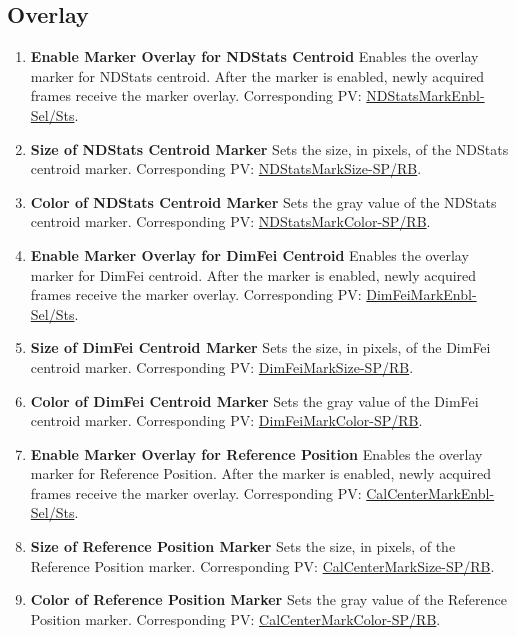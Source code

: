 \documentclass[openany]{article}
\begin{document}
    \subsection{Overlay}\label{sec:overlay}

        \begin{enumerate}
            \item \textbf{Enable Marker Overlay for NDStats Centroid} Enables the overlay marker for NDStats centroid. After the marker is enabled, newly acquired frames receive the marker overlay. Corresponding PV: \hyperlink{pv:ndstats-mark-enbl}{NDStatsMarkEnbl-Sel/Sts}.
            \item \textbf{Size of NDStats Centroid Marker} Sets the size, in pixels, of the NDStats centroid marker. Corresponding PV: \hyperlink{pv:ndstats-mark-size}{NDStatsMarkSize-SP/RB}.
            \item \textbf{Color of NDStats Centroid Marker} Sets the gray value of the NDStats centroid marker. Corresponding PV: \hyperlink{pv:ndstats-mark-color}{NDStatsMarkColor-SP/RB}.
            \item \textbf{Enable Marker Overlay for DimFei Centroid} Enables the overlay marker for DimFei centroid. After the marker is enabled, newly acquired frames receive the marker overlay. Corresponding PV: \hyperlink{pv:dimfei-mark-enbl}{DimFeiMarkEnbl-Sel/Sts}.
            \item \textbf{Size of DimFei Centroid Marker} Sets the size, in pixels, of the DimFei centroid marker. Corresponding PV: \hyperlink{pv:dimfei-mark-size}{DimFeiMarkSize-SP/RB}.
            \item \textbf{Color of DimFei Centroid Marker} Sets the gray value of the DimFei centroid marker. Corresponding PV: \hyperlink{pv:dimfei-mark-color}{DimFeiMarkColor-SP/RB}.
            \item \textbf{Enable Marker Overlay for Reference Position} Enables the overlay marker for Reference Position. After the marker is enabled, newly acquired frames receive the marker overlay. Corresponding PV: \hyperlink{pv:cal-center-mark-enbl}{CalCenterMarkEnbl-Sel/Sts}.
            \item \textbf{Size of Reference Position Marker} Sets the size, in pixels, of the Reference Position marker. Corresponding PV: \hyperlink{pv:cal-center-mark-size}{CalCenterMarkSize-SP/RB}.
            \item \textbf{Color of Reference Position Marker} Sets the gray value of the Reference Position marker. Corresponding PV: \hyperlink{pv:cal-center-mark-color}{CalCenterMarkColor-SP/RB}.

\end{enumerate}
\end{document}
